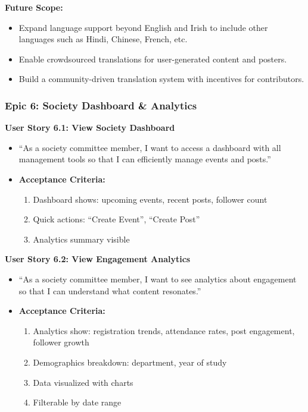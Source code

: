 \documentclass[12pt,a4paper]{article}
\begin{document}
\textbf{Future Scope:}
\begin{itemize}
    \item Expand language support beyond English and Irish to include other languages such as Hindi, Chinese, French, etc.
    \item Enable crowdsourced translations for user-generated content and posters.
    \item Build a community-driven translation system with incentives for contributors.
\end{itemize}

\subsubsection{Epic 6: Society Dashboard \& Analytics}

\textbf{User Story 6.1: View Society Dashboard}
\begin{itemize}
    \item ``As a society committee member, I want to access a dashboard with all management tools so that I can efficiently manage events and posts.''
    \item \textbf{Acceptance Criteria:}
    \begin{enumerate}
        \item Dashboard shows: upcoming events, recent posts, follower count
        \item Quick actions: ``Create Event'', ``Create Post''
        \item Analytics summary visible
    \end{enumerate}
\end{itemize}

\textbf{User Story 6.2: View Engagement Analytics}
\begin{itemize}
    \item ``As a society committee member, I want to see analytics about engagement so that I can understand what content resonates.''
    \item \textbf{Acceptance Criteria:}
    \begin{enumerate}
        \item Analytics show: registration trends, attendance rates, post engagement, follower growth
        \item Demographics breakdown: department, year of study
        \item Data visualized with charts
        \item Filterable by date range
    \end{enumerate}
\end{itemize}
\end{document}
